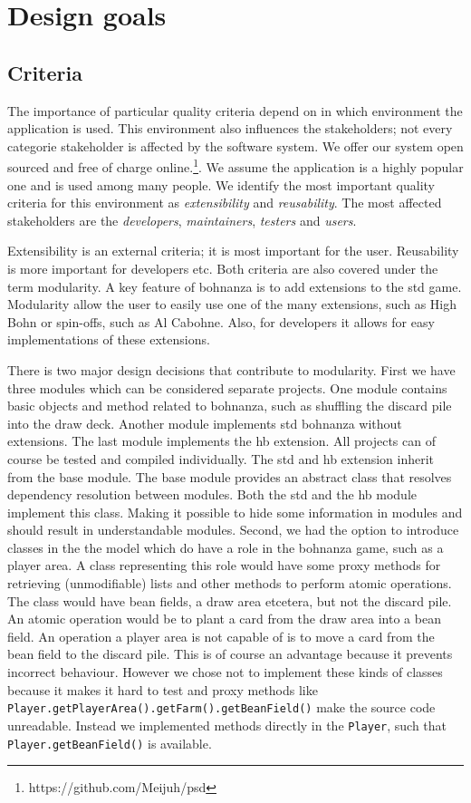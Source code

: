 \section{Design goals}
\subsection{Criteria}\label{ssec:criteria}
The importance of particular quality criteria depend on in which environment the application is
used. This environment also influences the stakeholders; not every categorie stakeholder is affected
by the software system. We offer our system open sourced and free of charge
online.\footnote{https://github.com/Meijuh/psd}. We assume the application is a highly popular one
and is used among many people. We identify the most important quality criteria for this
environment as \emph{extensibility} and \emph{reusability}. The most affected stakeholders are the
\emph{developers}, \emph{maintainers}, \emph{testers} and \emph{users}.

Extensibility is an external criteria; it is most important for the user. Reusability is more
important for developers etc. Both criteria are also covered under the term modularity. A key
feature of bohnanza is to add extensions to the \gls{std} game. Modularity allow the user to easily use one of the many extensions, such
as High Bohn or spin-offs, such as Al Cabohne. Also, for developers it allows for easy implementations of these extensions.  

There is two major design decisions that contribute to modularity. First we have three modules
which can be considered separate projects. One module contains basic objects and method related to
bohnanza, such as shuffling the discard pile into the draw deck. Another module implements \gls{std} 
bohnanza without extensions. The last module implements the \gls{hb} extension. All projects can
of course be tested and compiled individually. The \gls{std} and \gls{hb} extension inherit from the
base module. The base module provides an abstract class that resolves dependency resolution between
modules. Both the \gls{std} and the \gls{hb} module implement this class. Making it possible to hide
some information in modules and should result in understandable modules.
Second, we had the option to introduce classes in the the model which do have a role in the bohnanza game, such as a player area. A class
representing this role would have some proxy methods for retrieving (unmodifiable) lists and other methods to perform atomic operations. The
class would have bean fields, a draw area etcetera, but not the discard pile. An atomic operation would be to plant a card from the draw
area into a bean field. An operation a player area is not capable of is to move a card from the bean field to the discard pile. This is of
course an advantage because it prevents incorrect behaviour. However we chose not to implement these kinds of classes because it makes it
hard to test and proxy methods like \texttt{Player.getPlayerArea().getFarm().getBeanField()} make the source code unreadable. Instead we
implemented methods directly in the \texttt{Player}, such that \texttt{Player.getBeanField()} is available.

